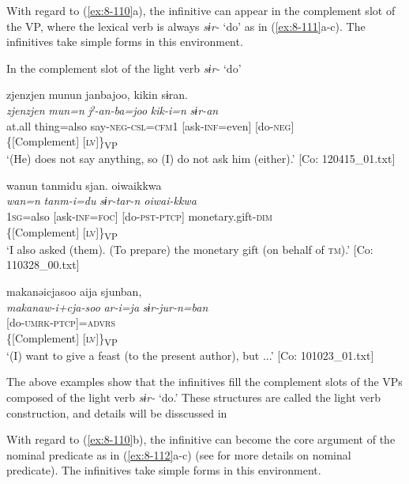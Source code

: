 With regard to (\ref{ex:8-110}a), the infinitive can appear in the complement slot of the VP, where the lexical verb is always \textit{sɨr-} ‘do’ as in (\ref{ex:8-111}a-c). The infinitives take simple forms in this environment.

\ea\label{ex:8-111}
  In the complement slot of the light verb \textit{sɨr-} ‘do’

\ea
{\TM}
\gllll  zjenzjen  munun  janbajoo,  kikin  sɨran.\\
\textit{zjenzjen}  \textit{mun=n}  \textit{jˀ-an-ba=joo}  \textit{kik-i=n}  \textit{sɨr-an}\\
at.all  thing=also  say-\textsc{neg}-\textsc{csl}=\textsc{cfm1}  [ask-\textsc{inf}=even]  [do-\textsc{neg}]\\
            \{[Complement]  [\textsc{lv}]\}\textsubscript{VP}\\
\glt ‘(He) does not say anything, so (I) do not ask him (either).’ [Co: 120415\_01.txt]

\ex {\TM}
\gllll  wanun  tanmidu  sjan.  {\textbar}oiwai{\textbar}kkwa\\
\textit{wan=n}  \textit{tanm-i=du}  \textit{sɨr-tar-n  oiwai-kkwa}\\
1\textsc{sg}=also  [ask-\textsc{inf}=\textsc{foc}]  [do-\textsc{pst}-\textsc{ptcp}]  monetary.gift-\textsc{dim}\\
        \{[Complement]  [\textsc{lv}]\}\textsubscript{VP}\\
\glt ‘I also asked (them). (To prepare) the monetary gift (on behalf of \textsc{tm}).’ [Co: 110328\_00.txt]

\ex {\TM}
\glll  makanəicjasoo  aija  sjunban,\\
\textit{makanaw-i+cja-soo}  \textit{ar-i=ja}  \textit{sɨr-jur-n=ban}\\
[give.a.feast-\textsc{ing}+want-\textsc{adj}  \textsc{stv}-\textsc{inf}=\textsc{top}]  [do-\textsc{umrk}-\textsc{ptcp}]=\textsc{advrs}\\
      \{[Complement]    [\textsc{lv}]\}\textsubscript{VP}\\
\glt ‘(I) want to give a feast (to the present author), but ...’ [Co: 101023\_01.txt]
\z
\z

The above examples show that the infinitives fill the complement slots of the VPs composed of the light verb \textit{sɨr-} ‘do.’ These structures are called the light verb construction, and details will be disscussed in 

  With regard to (\ref{ex:8-110}b), the infinitive can become the core argument of the nominal predicate as in (\ref{ex:8-112}a-c) (see  for more details on nominal predicate). The infinitives take simple forms in this environment.


